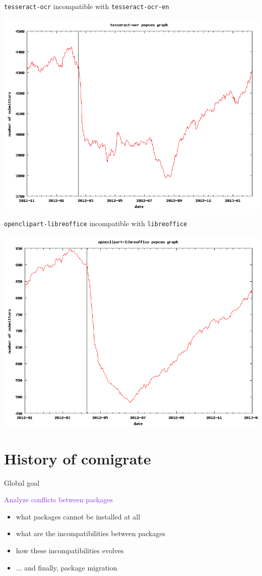 \documentclass[xcolor={dvipsnames}]{beamer}
\newcommand{\EEE}[1]{\textcolor{BlueViolet}{#1}}
\begin{document}
\begin{frame}
\texttt{tesseract-ocr} incompatible with \texttt{tesseract-ocr-en}
\begin{center}
\includegraphics[width=0.8\linewidth]{figures/tesseract-ocr}
\end{center}
\end{frame}

\begin{frame}
\texttt{openclipart-libreoffice} incompatible with \texttt{libreoffice}
\begin{center}
\includegraphics[width=0.8\linewidth]{figures/openclipart-libreoffice}
\end{center}
\end{frame}

\part{History of comigrate}
\frame{\partpage}

\begin{frame}{Global goal}

\EEE{Analyze conflicts between packages}
\begin{itemize}
\item what packages cannot be installed at all
\item what are the incompatibilities between packages
\item how these incompatibilities evolves
\item ... and finally, package migration
\end{itemize}

\end{frame}
\end{document}
